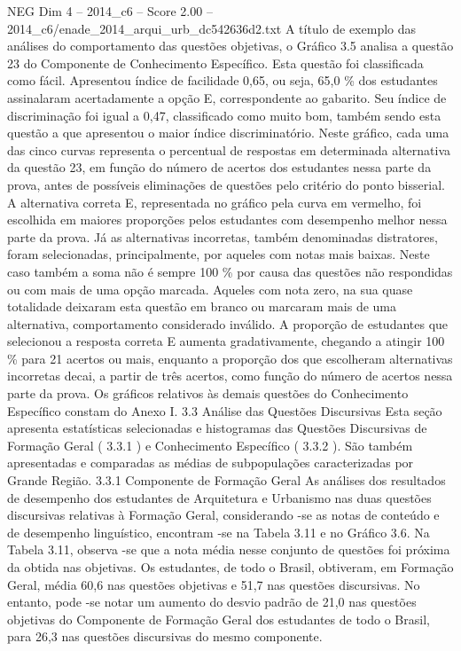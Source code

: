 \begin{textsample}{NEG Dim 4 – 2014\_c6 – Score 2.00 – 2014\_c6/enade\_2014\_arqui\_urb\_dc542636d2.txt}
A título de exemplo das análises do comportamento das questões objetivas, o Gráfico 3.5 analisa a questão 23 do Componente de Conhecimento Específico.
Esta questão foi classificada como fácil.
Apresentou índice de facilidade 0,65, ou seja, 65,0 \% dos estudantes assinalaram acertadamente a opção E, correspondente ao gabarito.
Seu índice de discriminação foi igual a 0,47, classificado como muito bom, também sendo esta questão a que apresentou o maior índice discriminatório.
Neste gráfico, cada uma das cinco curvas representa o percentual de respostas em determinada alternativa da questão 23, em função do número de acertos dos estudantes nessa parte da prova, antes de possíveis eliminações de questões pelo critério do ponto bisserial.
A alternativa correta E, representada no gráfico pela curva em vermelho, foi escolhida em maiores proporções pelos estudantes com desempenho melhor nessa parte da prova.
Já as alternativas incorretas, também denominadas distratores, foram selecionadas, principalmente, por aqueles com notas mais baixas.
Neste caso também a soma não é sempre 100 \% por causa das questões não respondidas ou com mais de uma opção marcada.
Aqueles com nota zero, na sua quase totalidade deixaram esta questão em branco ou marcaram mais de uma alternativa, comportamento considerado inválido.
A proporção de estudantes que selecionou a resposta correta E aumenta gradativamente, chegando a atingir 100 \% para 21 acertos ou mais, enquanto a proporção dos que escolheram alternativas incorretas decai, a partir de três acertos, como função do número de acertos nessa parte da prova.
Os gráficos relativos às demais questões do Conhecimento Específico constam do Anexo I. 3.3 Análise das Questões Discursivas Esta seção apresenta estatísticas selecionadas e histogramas das Questões Discursivas de Formação Geral ( 3.3.1 ) e Conhecimento Específico ( 3.3.2 ).
São também apresentadas e comparadas as médias de subpopulações caracterizadas por Grande Região. 3.3.1 Componente de Formação Geral As análises dos resultados de desempenho dos estudantes de Arquitetura e Urbanismo nas duas questões discursivas relativas à Formação Geral, considerando -se as notas de conteúdo e de desempenho linguístico, encontram -se na Tabela 3.11 e no Gráfico 3.6.
Na Tabela 3.11, observa -se que a nota média nesse conjunto de questões foi próxima da obtida nas objetivas.
Os estudantes, de todo o Brasil, obtiveram, em Formação Geral, média 60,6 nas questões objetivas e 51,7 nas questões discursivas.
No entanto, pode -se notar um aumento do desvio padrão de 21,0 nas questões objetivas do Componente de Formação Geral dos estudantes de todo o Brasil, para 26,3 nas questões discursivas do mesmo componente.

\end{textsample}
